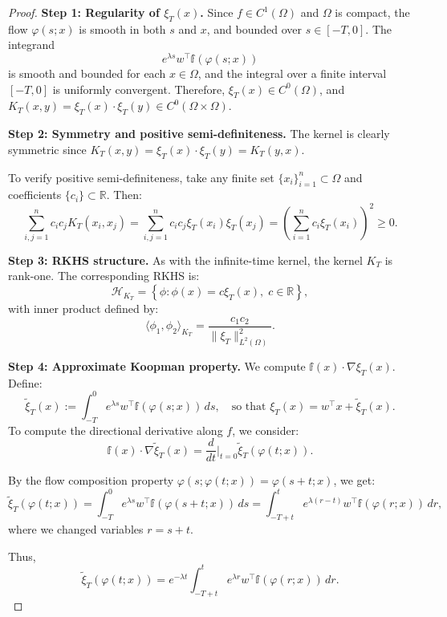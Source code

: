 \documentclass[10pt,a4paper]{amsart}
\begin{document}
\begin{proof}
\textbf{Step 1: Regularity of \( \xi_T(x) \).}  
Since \( f \in C^1(\Omega) \) and \( \Omega \) is compact, the flow \( \varphi(s; x) \) is smooth in both \( s \) and \( x \), and bounded over \( s \in [-T, 0] \). The integrand
\[
e^{\lambda s} w^\top {\mathbb f}(\varphi(s; x))
\]
is smooth and bounded for each \( x \in \Omega \), and the integral over a finite interval \( [-T, 0] \) is uniformly convergent. Therefore, \( \xi_T(x) \in C^0(\Omega) \), and \( K_T(x, y) = \xi_T(x) \cdot \xi_T(y) \in C^0(\Omega \times \Omega) \).

\medskip

\textbf{Step 2: Symmetry and positive semi-definiteness.}  
The kernel is clearly symmetric since \( K_T(x, y) = \xi_T(x) \cdot \xi_T(y) = K_T(y, x) \).  

To verify positive semi-definiteness, take any finite set \( \{x_i\}_{i=1}^n \subset \Omega \) and coefficients \( \{c_i\} \subset \mathbb{R} \). Then:
\[
\sum_{i,j=1}^n c_i c_j K_T(x_i, x_j)
= \sum_{i,j=1}^n c_i c_j \xi_T(x_i) \xi_T(x_j)
= \left( \sum_{i=1}^n c_i \xi_T(x_i) \right)^2 \ge 0.
\]

\medskip

\textbf{Step 3: RKHS structure.}  
As with the infinite-time kernel, the kernel \( K_T \) is rank-one. The corresponding RKHS is:
\[
\mathcal{H}_{K_T} = \left\{ \phi : \phi(x) = c \xi_T(x), \; c \in \mathbb{R} \right\},
\]
with inner product defined by:
\[
\langle \phi_1, \phi_2 \rangle_{K_T} = \frac{c_1 c_2}{\| \xi_T \|^2_{L^2(\Omega)}}.
\]

\medskip

\textbf{Step 4: Approximate Koopman property.}  
We compute \( {\mathbb f}(x) \cdot \nabla \xi_T(x) \). Define:
\[
\tilde{\xi}_T(x) := \int_{-T}^0 e^{\lambda s} w^\top {\mathbb f}(\varphi(s; x)) \, ds,
\quad \text{so that } \xi_T(x) = w^\top x + \tilde{\xi}_T(x).
\]
To compute the directional derivative along \( f \), we consider:
\[
{\mathbb f}(x) \cdot \nabla \tilde{\xi}_T(x) = \frac{d}{dt} \bigg|_{t=0} \tilde{\xi}_T(\varphi(t; x)).
\]

By the flow composition property \( \varphi(s; \varphi(t; x)) = \varphi(s + t; x) \), we get:
\[
\tilde{\xi}_T(\varphi(t; x)) = \int_{-T}^0 e^{\lambda s} w^\top {\mathbb f}(\varphi(s + t; x)) \, ds
= \int_{-T + t}^{t} e^{\lambda (r - t)} w^\top {\mathbb f}(\varphi(r; x)) \, dr,
\]
where we changed variables \( r = s + t \).

Thus,
\[
\tilde{\xi}_T(\varphi(t; x)) = e^{-\lambda t} \int_{-T + t}^{t} e^{\lambda r} w^\top {\mathbb f}(\varphi(r; x)) \, dr.
\]


\end{proof}
\end{document}
